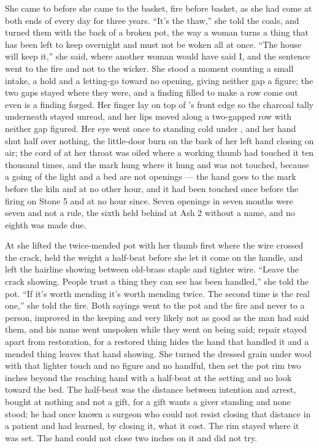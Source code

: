 She came to  before she came to the basket, fire before basket, as she had come at both ends of every day for three years. “It's the thaw,” she told the coals, and turned them with the back of a broken pot, the way a woman turns a thing that has been left to keep overnight and must not be woken all at once. “The house will keep it,” she said, where another woman would have said I, and the sentence went to the fire and not to the wicker. She stood a moment counting a small intake, a hold and a letting-go toward no opening, giving neither gap a figure; the two gaps stayed where they were, and a finding filled to make a row come out even is a finding forged. Her finger lay on top of 's front edge so the charcoal tally underneath stayed unread, and her lips moved along a two-gapped row with neither gap figured. Her eye went once to  standing cold under , and her hand shut half over nothing, the little-door burn on the back of her left hand closing on air; the cord of  at her throat was oiled where a working thumb had touched it ten thousand times, and the mark hung where it hung and was not touched, because a going of the light and a bed are not openings --- the hand goes to the mark before the kiln and at no other hour, and it had been touched once before the firing on Stone 5 and at no hour since. Seven openings in seven months were seven and not a rule, the sixth held behind at Ash 2 without a name, and no eighth was made due.

At  she lifted the twice-mended pot with her thumb first where the wire crossed the crack, held the weight a half-beat before she let it come on the handle, and left the hairline showing between old-brass staple and tighter wire. “Leave the crack showing. People trust a thing they can see has been handled,” she told the pot. “If it's worth mending it's worth mending twice. The second time is the real one,” she told the fire. Both sayings went to the pot and the fire and never to a person, improved in the keeping and very likely not as good as the man had said them, and his name went unspoken while they went on being said; repair stayed apart from restoration, for a restored thing hides the hand that handled it and a mended thing leaves that hand showing. She turned the dressed grain under wool with that lighter touch and no figure and no handful, then set the pot rim two inches beyond the reaching hand with a half-beat at the setting and no look toward the bed. The half-beat was the distance between intention and arrest, bought at nothing and not a gift, for a gift wants a giver standing and none stood; he had once known a surgeon who could not resist closing that distance in a patient and had learned, by closing it, what it cost. The rim stayed where it was set. The hand could not close two inches on it and did not try.


